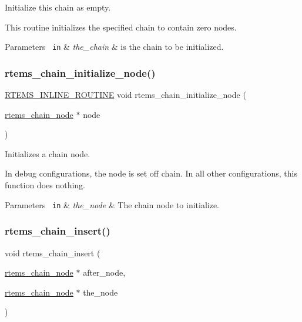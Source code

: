 Initialize this chain as empty. 

This routine initializes the specified chain to contain zero nodes.


\begin{DoxyParams}[1]{Parameters}
\mbox{\texttt{ in}}  & {\em the\+\_\+chain} & is the chain to be initialized. \\
\hline
\end{DoxyParams}
\mbox{\label{group__ClassicChains_ga8e0356d0c5f3efe5c26ddabfffe9f101}} 
\subsubsection{\texorpdfstring{rtems\_chain\_initialize\_node()}{rtems\_chain\_initialize\_node()}}
{\footnotesize\ttfamily \mbox{\hyperlink{group__RTEMSScoreBaseDefs_gac216239df231d5dbd15e3520b0b9313f}{R\+T\+E\+M\+S\+\_\+\+I\+N\+L\+I\+N\+E\+\_\+\+R\+O\+U\+T\+I\+NE}} void rtems\+\_\+chain\+\_\+initialize\+\_\+node (\begin{DoxyParamCaption}\item[{\mbox{\hyperlink{structChain__Node__struct}{rtems\+\_\+chain\+\_\+node}} $\ast$}]{node }\end{DoxyParamCaption})}



Initializes a chain node. 

In debug configurations, the node is set off chain. In all other configurations, this function does nothing.


\begin{DoxyParams}[1]{Parameters}
\mbox{\texttt{ in}}  & {\em the\+\_\+node} & The chain node to initialize. \\
\hline
\end{DoxyParams}
\mbox{\label{group__ClassicChains_ga2d55d75271c59d4eeb4ba0d61192b643}} 
\subsubsection{\texorpdfstring{rtems\_chain\_insert()}{rtems\_chain\_insert()}}
{\footnotesize\ttfamily void rtems\+\_\+chain\+\_\+insert (\begin{DoxyParamCaption}\item[{\mbox{\hyperlink{structChain__Node__struct}{rtems\+\_\+chain\+\_\+node}} $\ast$}]{after\+\_\+node,  }\item[{\mbox{\hyperlink{structChain__Node__struct}{rtems\+\_\+chain\+\_\+node}} $\ast$}]{the\+\_\+node }\end{DoxyParamCaption})}



